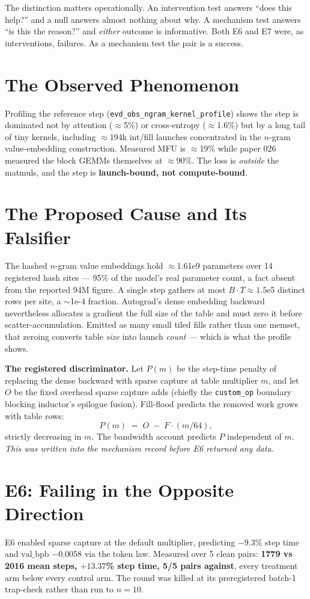 \documentclass{article}
\newcommand{\vb}{\mathrm{val\_bpb}}
\begin{document}
The distinction matters operationally. An intervention test answers ``does this help?'' and a null answers almost nothing about why. A mechanism test answers ``is this the reason?'' and \emph{either} outcome is informative. Both E6 and E7 were, as interventions, failures. As a mechanism test the pair is a success.

\section{The Observed Phenomenon}
Profiling the reference step (\texttt{evd\_obs\_ngram\_kernel\_profile}) shows the step is dominated not by attention ($\approx$5\%) or cross-entropy ($\approx$1.6\%) but by a long tail of tiny kernels, including $\approx$194k int/fill launches concentrated in the $n$-gram value-embedding construction. Measured MFU is $\approx$19\% while paper 026 measured the block GEMMs themselves at $\approx$90\%. The loss is \emph{outside} the matmuls, and the step is \textbf{launch-bound, not compute-bound}.

\section{The Proposed Cause and Its Falsifier}
The hashed $n$-gram value embeddings hold $\approx$1.61e9 parameters over 14 registered hash sites --- 95\% of the model's real parameter count, a fact absent from the reported 94M figure. A single step gathers at most $B{\cdot}T \approx 1.5$e5 distinct rows per site, a $\sim$1e-4 fraction. Autograd's dense embedding backward nevertheless allocates a gradient the full size of the table and must zero it before scatter-accumulation. Emitted as many small tiled fills rather than one memset, that zeroing converts table \emph{size} into launch \emph{count} --- which is what the profile shows.

\textbf{The registered discriminator.} Let $P(m)$ be the step-time penalty of replacing the dense backward with sparse capture at table multiplier $m$, and let $O$ be the fixed overhead sparse capture adds (chiefly the \texttt{custom\_op} boundary blocking inductor's epilogue fusion). Fill-flood predicts the removed work grows with table rows:
\[
P(m) \;=\; O \;-\; F\cdot(m/64),
\]
strictly decreasing in $m$. The bandwidth account predicts $P$ independent of $m$. \emph{This was written into the mechanism record before E6 returned any data.}

\section{E6: Failing in the Opposite Direction}
E6 enabled sparse capture at the default multiplier, predicting $-9.3$\% step time and $\vb$ $-0.0058$ via the token law. Measured over 5 clean pairs: \textbf{1779 vs 2016 mean steps, $+13.37$\% step time, 5/5 pairs against}, every treatment arm below every control arm. The round was killed at its preregistered batch-1 trap-check rather than run to $n{=}10$.
\end{document}
